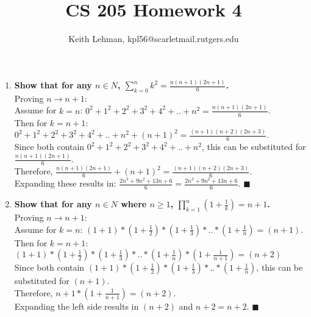 \documentclass{article}
\title{CS 205 Homework 4}
\author{Keith Lehman, kpl56@scarletmail.rutgers.edu}
\begin{document}
\maketitle

\begin{enumerate}

\item \textbf{Show that for any $n \in N$, $\sum_{k=0}^{n} k^2 = \frac{n(n+1)(2n+1)}{6}$.} \\
Proving $n \to n+1$: \\
Assume for $k=n$: $0^2 + 1^2 + 2^2 + 3^2 + 4^2 + .. + n^2 = \frac{n(n+1)(2n+1)}{6}$. \\
Then for $k=n+1$: $0^2 + 1^2 + 2^2 + 3^2 + 4^2 + .. + n^2 + (n+1)^2 = \frac{(n+1)(n+2)(2n+3)}{6}$. \\
Since both contain $0^2 + 1^2 + 2^2 + 3^2 + 4^2 + .. + n^2$, this can be substituted for $\frac{n(n+1)(2n+1)}{6}$. \\
Therefore, $\frac{n(n+1)(2n+1)}{6} + (n+1)^2 = \frac{(n+1)(n+2)(2n+3)}{6}$. \\
Expanding these results in: $\frac{2n^3 + 9n^2 + 13n + 6}{6} = \frac{2n^3 + 9n^2 + 13n + 6}{6}$. $\blacksquare$

\item \textbf{Show that for any $n \in N$ where $n \geq 1$, $\prod_{k=1}^{n} (1 + \frac{1}{k}) = n + 1$.} \\
Proving $n \to n+1$: \\
Assume for $k=n$: $(1+1) * (1+\frac{1}{2}) * (1+\frac{1}{3}) * .. * (1+\frac{1}{n}) = (n+1)$. \\
Then for $k=n+1$: $(1+1) * (1+\frac{1}{2}) * (1+\frac{1}{3}) * .. * (1+\frac{1}{n}) * (1+\frac{1}{n+1})= (n+2)$ \\
Since both contain $(1+1) * (1+\frac{1}{2}) * (1+\frac{1}{3}) * .. * (1+\frac{1}{n})$, this can be substituted for $(n+1)$. \\
Therefore, $n+1 * (1+\frac{1}{n+1}) = (n+2)$. \\
Expanding the left side results in $(n+2)$ and $n+2 = n+2$. $\blacksquare$

\end{enumerate}
\end{document}
